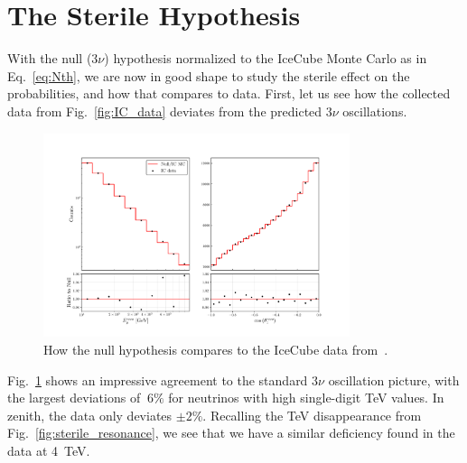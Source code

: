 % 

% 
\section{The Sterile Hypothesis}\label{sec:sterileResults}
With the null ($3\nu$) hypothesis normalized to the IceCube Monte Carlo as in Eq.~\ref{eq:Nth}, we are now in good shape to study the sterile effect on the probabilities, and how that compares to data.
First, let us see how the collected data from Fig.~\ref{fig:IC_data} deviates from the predicted $3\nu$ oscillations.
\begin{figure}
    \centering
    \includegraphics[width=0.8\textwidth]{figures/IC_rates.pdf}
    \caption{How the null hypothesis compares to the IceCube data from~\cite{IC2020}.}\label{fig:IC_rates}
\end{figure}
Fig.~\ref{fig:IC_rates} shows an impressive agreement to the standard $3\nu$ oscillation picture, with the largest deviations of $~6\%$
for neutrinos with high single-digit \si{\TeV} values. In zenith, the data only deviates $\pm 2\%$. Recalling the \si{\TeV} disappearance from 
Fig.~\ref{fig:sterile_resonance}, we see that we have a similar deficiency found in the data at \SI{4}{\TeV}. 

